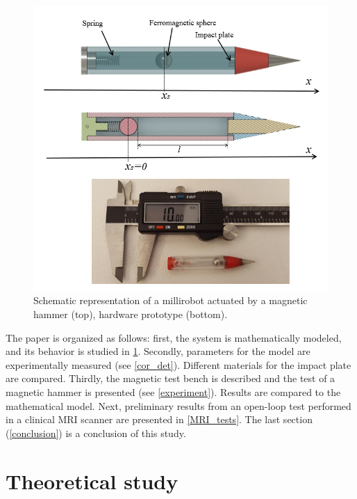 \documentclass[letterpaper, 10 pt, conference]{ieeeconf}  %
\begin{document}
\begin{figure}
  \includegraphics[width=\linewidth]{figure1-2.png}
  \caption{Schematic representation of a millirobot actuated by a magnetic hammer (top), hardware prototype (bottom).}
  \label{millirobot}
  \vspace{-2em}
\end{figure}

The paper is organized as follows: first, the system is mathematically modeled, and its behavior is studied in \cref{theoretical}. Secondly, parameters for the model are experimentally measured (see \cref{cor_det}). Different materials for the impact plate are compared. Thirdly, the magnetic test bench is described and the test of a magnetic hammer is presented (see \cref{experiment}). Results are compared to the mathematical model. Next, preliminary results from an open-loop test performed in a clinical MRI scanner are presented in \cref{MRI_tests}. The last section (\cref{conclusion}) is a conclusion of this study.


\section{Theoretical study}
\label{theoretical}
\end{document}
